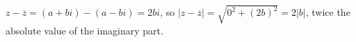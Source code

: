 $z-\overline z=(a+bi)-(a-bi)=2bi$, so $\left|z-\overline z\right|=\sqrt{0^2+(2b)^2}=\boxed{2|b|}$, twice the absolute value of the imaginary part.
